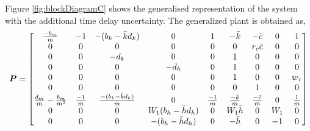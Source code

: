 Figure \ref{fig:blockDiagramC} shows the generalised representation of the system with the additional time delay uncertainty. The generalized plant is obtained as,
\begin{align*}
    \bm{P} = 
    \begin{bmatrix}
        \frac{-b_m}{\Bar{m}} & -1 & -(b_k-\Bar{k}d_k) & 0 & 1 & -\Bar{k} & -\Bar{c} & 0 & 1\\
        0 & 0 & 0 & 0 & 0 & 0 & r_c\Bar{c} & 0 & 0\\
        0 & 0 & -d_k & 0 & 0 & 1 & 0 & 0 & 0\\
        0 & 0 & 0 & -d_h & 0 & 1 & 0 & 0 & 0\\
        0 & 0 & 0 & 0 & 0 & 1 & 0 & 0 & w_\tau\\
        0 & 0 & 0 & 0 & 0 & 0 & 1 & 0 & 0\\
        \frac{d_m}{\Bar{m}} - \frac{b_m}{\Bar{m}^2} & \frac{-1}{\Bar{m}} & \frac{-(b_k-\Bar{k}d_k)}{\Bar{m}} & 0 & \frac{-1}{\Bar{m}} & \frac{-\Bar{k}}{\Bar{m}} & \frac{-\Bar{c}}{\Bar{m}} & 0 & \frac{1}{\Bar{m}}\\
        0 & 0 & 0 & W_1(b_h-\Bar{h}d_h) & 0 & W_1\Bar{h} & 0 & W_1 & 0\\
        0 & 0 & 0 & -(b_h-\Bar{h}d_h) & 0 & -\Bar{h} & 0 & -1 & 0
    \end{bmatrix}
\end{align*}
